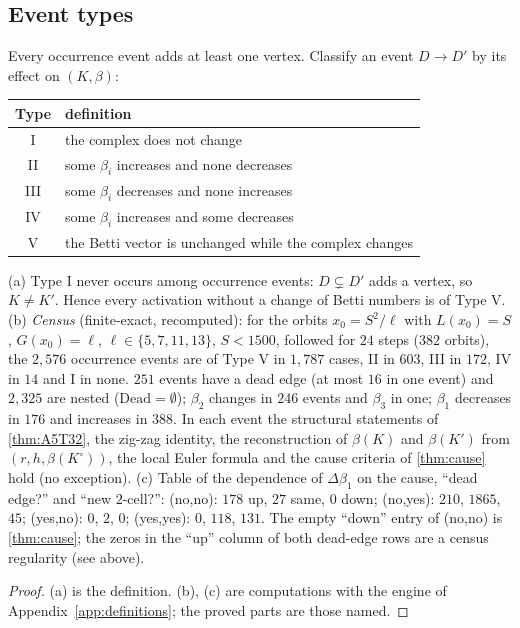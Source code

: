 \subsection{Event types}
Every occurrence event adds at least one vertex. Classify an event $D\to D'$ by its effect on $(K,\beta)$:
\begin{center}\small
\begin{tabular}{@{}cl@{}}\toprule
Type & definition\\\midrule
I & the complex does not change\\
II & some $\beta_i$ increases and none decreases\\
III & some $\beta_i$ decreases and none increases\\
IV & some $\beta_i$ increases and some decreases\\
V & the Betti vector is unchanged while the complex changes\\\bottomrule
\end{tabular}
\end{center}
\begin{theorem}\label{thm:A5T7}
(a) Type I never occurs among occurrence events: $D\subsetneq D'$ adds a vertex, so $K\ne K'$. Hence every activation without a change of Betti numbers is of Type V.
(b) \emph{Census} (finite-exact, recomputed): for the orbits $x_0=S^2/\ell$ with $L(x_0)=S$, $G(x_0)=\ell$, $\ell\in\{5,7,11,13\}$, $S<1500$, followed for $24$ steps ($382$ orbits), the $2{,}576$ occurrence events are of Type V in $1{,}787$ cases, II in $603$, III in $172$, IV in $14$ and I in none. $251$ events have a dead edge (at most $16$ in one event) and $2{,}325$ are nested ($\mathrm{Dead}=\emptyset$); $\beta_2$ changes in $246$ events and $\beta_3$ in one; $\beta_1$ decreases in $176$ and increases in $388$. In each event the structural statements of \cref{thm:A5T32}, the zig-zag identity, the reconstruction of $\beta(K)$ and $\beta(K')$ from $(r,h,\beta(K^\circ))$, the local Euler formula and the cause criteria of \cref{thm:cause} hold (no exception).
(c) Table of the dependence of $\Delta\beta_1$ on the cause, ``dead edge?'' and ``new $2$-cell?'': (no,no): $178$ up, $27$ same, $0$ down; (no,yes): $210$, $1865$, $45$; (yes,no): $0$, $2$, $0$; (yes,yes): $0$, $118$, $131$. The empty ``down'' entry of (no,no) is \cref{thm:cause}; the zeros in the ``up'' column of both dead-edge rows are a census regularity (see above).
\end{theorem}
\begin{proof}
(a) is the definition. (b), (c) are computations with the engine of Appendix~\ref{app:definitions}; the proved parts are those named. \qedhere
\end{proof}
